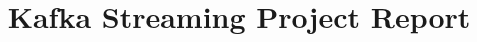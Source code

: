 \documentclass[letterpaper]{article}
\title{Kafka Streaming Project Report}
\begin{document}
%
\maketitle
%

\section{}

\end{document}
